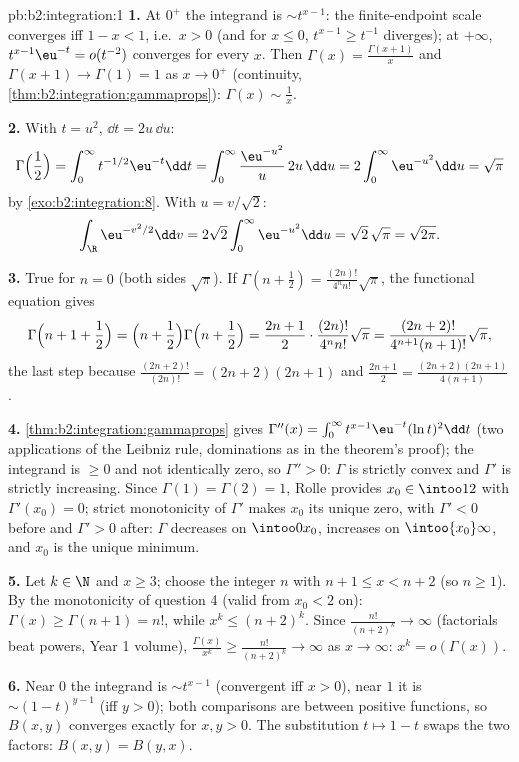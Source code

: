 \begin{solution}{pb:b2:integration:1}
\textbf{1.} At $0^+$ the integrand is $\sim t^{x-1}$: the
finite-endpoint scale converges iff $1 - x < 1$, i.e.\ $x > 0$
(and for $x \leq 0$, $t^{x-1} \geq t^{-1}$ diverges); at
$+\infty$, $t^{x-1}\eu^{-t} = o(t^{-2})$ converges for every
$x$. Then $\Gamma(x) = \frac{\Gamma(x+1)}{x}$ and $\Gamma(x+1)
\to \Gamma(1) = 1$ as $x \to 0^+$ (continuity,
\cref{thm:b2:integration:gammaprops}): $\Gamma(x) \sim
\frac1x$.

\textbf{2.} With $t = u^2$, $\dd t = 2u\,\dd u$:
\[
\Gamma\Bigl(\frac12\Bigr) = \int_0^\infty
t^{-1/2}\eu^{-t}\dd t
= \int_0^\infty \frac{\eu^{-u^2}}{u}\,2u\,\dd u
= 2\int_0^\infty \eu^{-u^2}\dd u = \sqrt\pi
\]
by \cref{exo:b2:integration:8}. With $u = v/\sqrt2$:
\[
\int_\R \eu^{-v^2/2}\dd v
= 2\sqrt2\int_0^\infty \eu^{-u^2}\dd u
= \sqrt2\,\sqrt\pi = \sqrt{2\pi} .
\]

\textbf{3.} True for $n = 0$ (both sides $\sqrt\pi$). If
$\Gamma(n + \frac12) = \frac{(2n)!}{4^n n!}\sqrt\pi$, the
functional equation gives
\[
\Gamma\Bigl(n + 1 + \frac12\Bigr)
= \Bigl(n + \frac12\Bigr)\Gamma\Bigl(n + \frac12\Bigr)
= \frac{2n+1}{2}\cdot\frac{(2n)!}{4^n n!}\sqrt\pi
= \frac{(2n+2)!}{4^{n+1}(n+1)!}\sqrt\pi ,
\]
the last step because $\frac{(2n+2)!}{(2n)!} = (2n+2)(2n+1)$
and $\frac{2n+1}{2} = \frac{(2n+2)(2n+1)}{4(n+1)}$.

\textbf{4.} \cref{thm:b2:integration:gammaprops} gives
$\Gamma''(x) = \int_0^\infty t^{x-1}\eu^{-t}(\ln t)^2\dd t$
(two applications of the Leibniz rule, dominations as in the
theorem's proof); the integrand is $\geq 0$ and not identically
zero, so $\Gamma'' > 0$: $\Gamma$ is strictly convex and
$\Gamma'$ is strictly increasing. Since $\Gamma(1) = \Gamma(2)
= 1$, Rolle provides $x_0 \in \intoo12$ with $\Gamma'(x_0) =
0$; strict monotonicity of $\Gamma'$ makes $x_0$ its unique
zero, with $\Gamma' < 0$ before and $\Gamma' > 0$ after:
$\Gamma$ decreases on $\intoo0{x_0}$, increases on
$\intoo{x_0}\infty$, and $x_0$ is the unique minimum.

\textbf{5.} Let $k \in \N$ and $x \geq 3$; choose the integer
$n$ with $n + 1 \leq x < n + 2$ (so $n \geq 1$). By the
monotonicity of question 4 (valid from $x_0 < 2$ on): $\Gamma(x)
\geq \Gamma(n + 1) = n!$, while $x^k \leq (n+2)^k$. Since
$\frac{n!}{(n+2)^k} \to \infty$ (factorials beat powers, Year 1
volume), $\frac{\Gamma(x)}{x^k} \geq \frac{n!}{(n+2)^k} \to
\infty$ as $x \to \infty$: $x^k = o(\Gamma(x))$.

\textbf{6.} Near $0$ the integrand is $\sim t^{x-1}$
(convergent iff $x > 0$), near $1$ it is $\sim (1-t)^{y-1}$
(iff $y > 0$); both comparisons are between positive functions,
so $B(x,y)$ converges exactly for $x, y > 0$. The substitution
$t \mapsto 1 - t$ swaps the two factors: $B(x,y) = B(y,x)$.


\end{solution}
